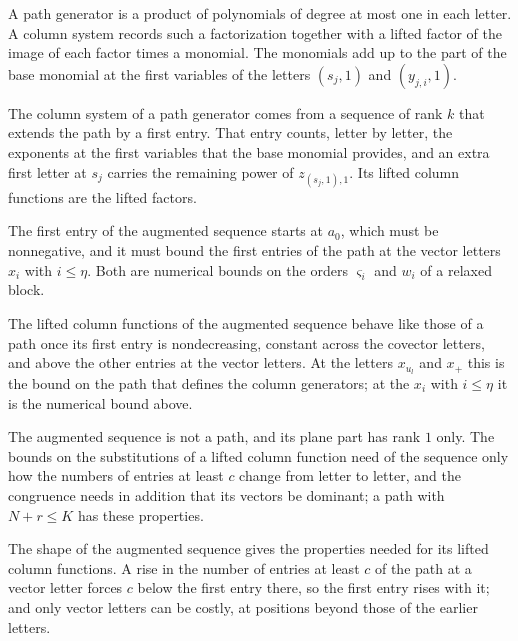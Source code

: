 A path generator is a product of polynomials of degree at most one in each letter. A column system records such a
factorization together with a lifted factor of the image of each factor times a monomial. The monomials add up to the part of
the base monomial at the first variables of the letters $(s_j,1)$ and $(y_{j,i},1)$.

The column system of a path generator comes from a sequence of rank $k$ that extends the path by a first entry. That entry
counts, letter by letter, the exponents at the first variables that the base monomial provides, and an extra first letter at
$s_j$ carries the remaining power of $z_{(s_j,1),1}$. Its lifted column functions are the lifted factors.

The first entry of the augmented sequence starts at $a_0$, which must be nonnegative, and it must bound the first entries of
the path at the vector letters $x_i$ with $i\leq\eta$. Both are numerical bounds on the orders $\varsigma_i$ and $w_i$ of a
relaxed block.

The lifted column functions of the augmented sequence behave like those of a path once its first entry is nondecreasing,
constant across the covector letters, and above the other entries at the vector letters. At the letters $x_{u_l}$ and $x_+$
this is the bound on the path that defines the column generators; at the $x_i$ with $i\leq\eta$ it is the numerical bound
above.

The augmented sequence is not a path, and its plane part has rank $1$ only. The bounds on the substitutions of a lifted column
function need of the sequence only how the numbers of entries at least $c$ change from letter to letter, and the congruence needs
in addition that its vectors be dominant; a path with $N+r\leq K$ has these properties.

The shape of the augmented sequence gives the properties needed for its lifted column functions. A rise in the number of entries
at least $c$ of the path at a vector letter forces $c$ below the first entry there, so the first entry rises with it; and only
vector letters can be costly, at positions beyond those of the earlier letters.

